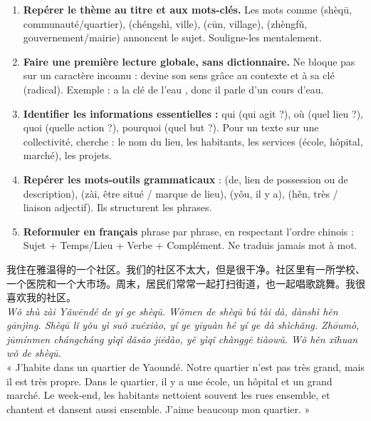 \documentclass[11pt]{article}
\newcommand{\zh}[1]{\ifmmode\text{#1}\else{#1}\fi}
\begin{document}
\begin{methode}
\begin{enumerate}
\item \textbf{Repérer le thème au titre et aux mots-clés.} Les mots comme \zh{社区} (shèqū, communauté/quartier), \zh{城市} (chéngshì, ville), \zh{村} (cūn, village), \zh{政府} (zhèngfǔ, gouvernement/mairie) annoncent le sujet. Souligne-les mentalement.
\item \textbf{Faire une première lecture globale, sans dictionnaire.} Ne bloque pas sur un caractère inconnu : devine son sens grâce au contexte et à sa clé (radical). Exemple : \zh{河} a la clé de l'eau \zh{氵}, donc il parle d'un cours d'eau.
\item \textbf{Identifier les informations essentielles :} qui (qui agit ?), où (quel lieu ?), quoi (quelle action ?), pourquoi (quel but ?). Pour un texte sur une collectivité, cherche : le nom du lieu, les habitants, les services (école, hôpital, marché), les projets.
\item \textbf{Repérer les mots-outils grammaticaux} : \zh{的} (de, lien de possession ou de description), \zh{在} (zài, être situé / marque de lieu), \zh{有} (yǒu, il y a), \zh{很} (hěn, très / liaison adjectif). Ils structurent les phrases.
\item \textbf{Reformuler en français} phrase par phrase, en respectant l'ordre chinois : Sujet + Temps/Lieu + Verbe + Complément. Ne traduis jamais mot à mot.
\end{enumerate}
\end{methode}

\begin{textebox}
我住在雅温得的一个社区。我们的社区不太大，但是很干净。社区里有一所学校、一个医院和一个大市场。周末，居民们常常一起打扫街道，也一起唱歌跳舞。我很喜欢我的社区。\\
\emph{Wǒ zhù zài Yǎwēndé de yí ge shèqū. Wǒmen de shèqū bú tài dà, dànshì hěn gānjìng. Shèqū lǐ yǒu yì suǒ xuéxiào, yí ge yīyuàn hé yí ge dà shìchǎng. Zhōumò, jūmínmen chángcháng yìqǐ dǎsǎo jiēdào, yě yìqǐ chànggē tiàowǔ. Wǒ hěn xǐhuan wǒ de shèqū.}\\
« J'habite dans un quartier de Yaoundé. Notre quartier n'est pas très grand, mais il est très propre. Dans le quartier, il y a une école, un hôpital et un grand marché. Le week-end, les habitants nettoient souvent les rues ensemble, et chantent et dansent aussi ensemble. J'aime beaucoup mon quartier. »
\end{textebox}
\end{document}

